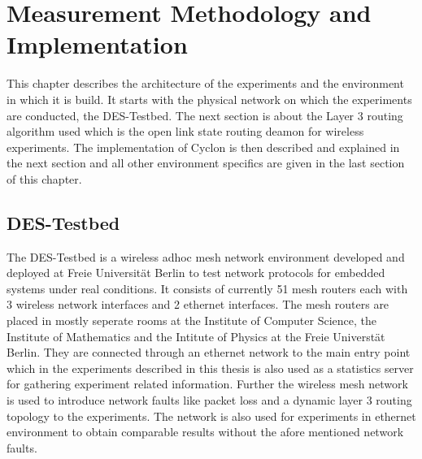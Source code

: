 \chapter{Measurement Methodology and Implementation} 
\label{chap:methodology}
This chapter describes the architecture of the experiments and the environment
in which it is build. It starts with the physical network on which the
experiments are conducted, the DES-Testbed. The next section is about the Layer
3 routing algorithm used which is the open link state routing deamon for
wireless experiments. The implementation of Cyclon is then described and
explained in the next section and all other environment specifics are given in
the last section of this chapter.

\section{DES-Testbed}
The DES-Testbed is a wireless adhoc mesh network environment developed and
deployed at Freie Universität Berlin to test network protocols for embedded
systems under real conditions. It consists of currently 51 mesh routers each
with 3 wireless network interfaces and 2 ethernet interfaces. The mesh routers
are placed in mostly seperate rooms at the Institute of Computer Science, the
Institute of Mathematics and the Intitute of Physics at the Freie Universtät
Berlin. They are connected through an ethernet network to the main entry point
which in the experiments described in this thesis is also used as a statistics
server for gathering experiment related information. Further the wireless mesh
network is used to introduce network faults like packet loss and a
dynamic layer 3 routing topology to the experiments. The network is also used
for experiments in ethernet environment to obtain comparable results without the
afore mentioned network faults.
%

